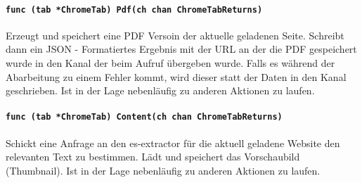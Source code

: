 \paragraph{\texttt{func (tab *ChromeTab) Pdf(ch chan ChromeTabReturns)}}  Erzeugt und speichert eine PDF Versoin der aktuelle geladenen Seite. Schreibt dann ein JSON - Formatiertes Ergebnis mit der URL an der die PDF gespeichert wurde in den Kanal der beim Aufruf übergeben wurde. Falls es während der Abarbeitung zu einem Fehler kommt, wird dieser statt der Daten in den Kanal geschrieben. Ist in der Lage nebenläufig zu anderen Aktionen zu laufen.
\paragraph{\texttt{func (tab *ChromeTab) Content(ch chan ChromeTabReturns)}} 
Schickt eine Anfrage an den es-extractor für die aktuell geladene Website den relevanten Text zu bestimmen. Lädt und speichert das Vorschaubild (Thumbnail). Ist in der Lage nebenläufig zu anderen Aktionen zu laufen.
